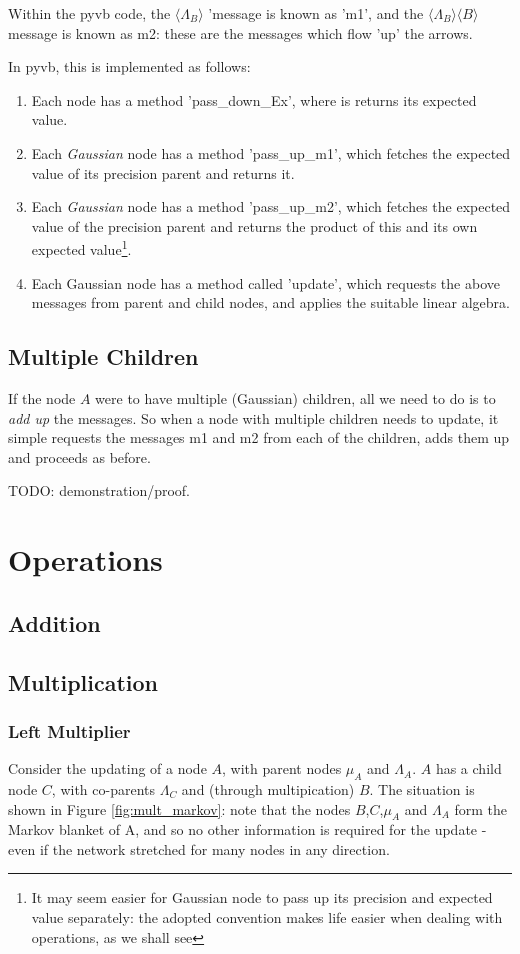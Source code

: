 \documentclass{article}
\newcommand{\<}{\langle}
\renewcommand{\>}{\rangle}
\begin{document}
Within the pyvb code, the $\<\Lambda_B\>$ 'message is known as 'm1', and the $\<\Lambda_B\> \<B\>$ message is known as m2: these are the messages which flow 'up' the arrows. 

In pyvb, this is implemented as follows:
\begin{enumerate}
\item Each node has a method 'pass\_down\_Ex', where is returns its expected value. 
\item Each {\em Gaussian} node has a method 'pass\_up\_m1', which fetches the expected value of its precision parent and returns it.
\item Each {\em Gaussian} node has a method 'pass\_up\_m2', which fetches the expected value of the precision parent and returns the product of this and its own expected value\footnote{It may seem easier for Gaussian node to pass up its precision and expected value separately: the adopted convention makes life easier when dealing with operations, as we shall see}. 
\item Each Gaussian node has a method called 'update', which requests the above messages from parent and child nodes, and applies the suitable linear algebra.
\end{enumerate}

\subsection{Multiple Children}
If the node $A$ were to have multiple (Gaussian) children, all we need to do is to {\em add up} the messages. So when a node with multiple children needs to update, it simple requests the messages m1 and m2 from each of the children, adds them up and proceeds as before.  

TODO: demonstration/proof.  



\section{Operations}
\subsection{Addition}
\subsection{Multiplication}
\subsubsection{Left Multiplier}
Consider the updating of a node $A$, with parent nodes $\mu_A$ and $\Lambda_A$.  $A$ has a child node $C$, with co-parents $\Lambda_C$ and (through multipication) $B$.  The situation is shown in Figure \ref{fig:mult_markov}:
note that the nodes $B$,$C$,$\mu_A$ and $\Lambda_A$ form the Markov blanket of A, and so no other information is required for the update - even if the network stretched for many nodes in any direction.  
\end{document}
